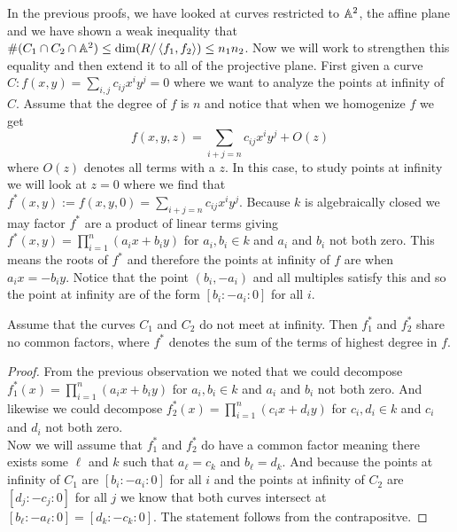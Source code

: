 In the previous proofs, we have looked at curves restricted to $\mathbb{A}^2$, the affine plane and we have shown a weak inequality that $\#(C_1\cap C_2\cap\mathbb{A}^2)\leq \dim(R/\left\langle f_1,f_2 \right\rangle) \leq n_1n_2$. Now we will work to strengthen this equality and then extend it to all of the projective plane. First given a curve $C:f(x,y)=\sum_{i,j}c_{ij}x^iy^j=0$ where we want to analyze the points at infinity of $C$. Assume that the degree of $f$ is $n$ and notice that when we homogenize $f$ we get 
$$f(x,y,z)=\sum_{i+j=n}c_{ij}x^iy^j+O(z)$$
where $O(z)$ denotes all terms with a $z$. In this case, to study points at infinity we will look at $z=0$ where we find that $f^*(x,y):=f(x,y,0)=\sum_{i+j=n}c_{ij}x^iy^j$. Because $k$ is algebraically closed we may factor $f^*$ are a product of linear terms giving $f^*(x,y)=\prod_{i=1}^n(a_ix+b_iy)$ for $a_i,b_i\in k$ and $a_i$ and $b_i$ not both zero. This means the roots of $f^*$ and therefore the points at infinity of $f$ are when $a_ix=-b_iy$. Notice that the point $(b_i,-a_i)$ and all multiples satisfy this and so the point at infinity are of the form $[b_i:-a_i:0]$ for all $i$.


\begin{lemma}
    \label{lem:22}
    Assume that the curves $C_1$ and $C_2$ do not meet at infinity. Then $f_1^*$ and $f_2^*$ share no common factors, where $f^*$ denotes the sum of the terms of highest degree in $f$.
\end{lemma}
\begin{proof}
    From the previous observation we noted that we could decompose $f_1^*(x)=\prod_{i=1}^n(a_ix+b_iy)$ for $a_i,b_i\in k$ and $a_i$ and $b_i$ not both zero. And likewise we could decompose $f_2^*(x)=\prod_{i=1}^n(c_ix+d_iy)$ for $c_i,d_i\in k$ and $c_i$ and $d_i$ not both zero.\\

    Now we will assume that $f_1^*$ and $f_2^*$ do have a common factor meaning there exists some $\ell$ and $k$ such that $a_\ell=c_k$ and $b_\ell=d_k$. And because the points at infinity of $C_1$ are $[b_i:-a_i:0]$ for all $i$ and the points at infinity of $C_2$ are $[d_j:-c_j:0]$ for all $j$ we know that both curves intersect at $[b_\ell:-a_\ell:0]=[d_k:-c_k:0]$. The statement follows from the contrapositve.
\end{proof}

